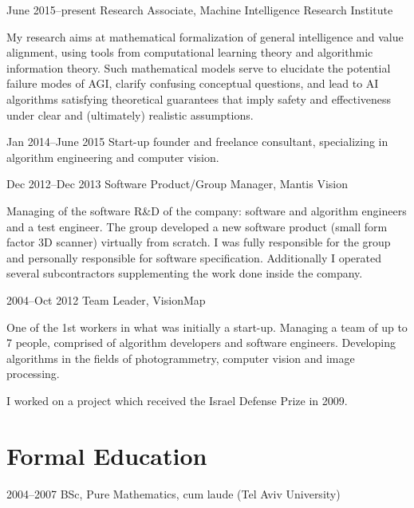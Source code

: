 \documentclass[a4paper]{article}
\begin{document}
\begin{CV}
\item[June 2015--present] Research Associate, Machine Intelligence Research Institute

My research aims at mathematical formalization of general intelligence and value alignment, using tools from computational learning theory and algorithmic information theory. Such mathematical models serve to elucidate the potential failure modes of AGI, clarify confusing conceptual questions, and lead to AI algorithms satisfying theoretical guarantees that imply safety and effectiveness under clear and (ultimately) realistic assumptions.

\item[Jan 2014--June 2015] Start-up founder and freelance consultant, specializing in algorithm engineering and computer vision.

\item[Dec 2012--Dec 2013] Software Product/Group Manager, Mantis Vision

Managing of the software R\&D of the company: software and algorithm engineers and a test engineer. The group developed a new software product (small form factor 3D scanner) virtually from scratch. I was fully responsible for the group and personally responsible for software specification. Additionally I operated several subcontractors supplementing the work done inside the company.

\item[2004--Oct 2012] Team Leader, VisionMap

One of the 1st workers in what was initially a start-up. Managing a team of up to 7 people, comprised of algorithm developers and software engineers. Developing algorithms in the fields of photogrammetry, computer vision and image processing.

I worked on a project which received the Israel Defense Prize in 2009.

\end{CV}

\section{Formal Education}

\begin{CV}

\item[2004--2007] BSc, Pure Mathematics, cum laude (Tel Aviv University)

\end{CV}
\end{document}
